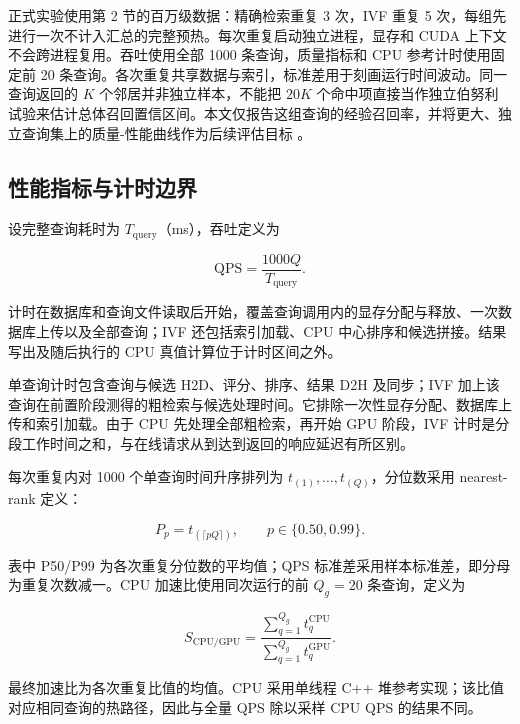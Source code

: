 \documentclass[UTF8,a4paper,zihao=5,fontset=none]{ctexart}
\begin{document}
正式实验使用第 2 节的百万级数据：精确检索重复 3 次，IVF 重复 5 次，每组先进行一次不计入汇总的完整预热。每次重复启动独立进程，显存和 CUDA 上下文不会跨进程复用。吞吐使用全部 1000 条查询，质量指标和 CPU 参考计时使用固定前 20 条查询。各次重复共享数据与索引，标准差用于刻画运行时间波动。同一查询返回的 $K$ 个邻居并非独立样本，不能把 $20K$ 个命中项直接当作独立伯努利试验来估计总体召回置信区间。本文仅报告这组查询的经验召回率，并将更大、独立查询集上的质量-性能曲线作为后续评估目标 \cite{r5}。


\subsection{性能指标与计时边界}

设完整查询耗时为 $T_{\mathrm{query}}$（ms），吞吐定义为


\nopagebreak[4]
\begin{equation}
\label{eq:5}
\mathrm{QPS}=\frac{1000Q}{T_{\mathrm{query}}}.
\end{equation}

计时在数据库和查询文件读取后开始，覆盖查询调用内的显存分配与释放、一次数据库上传以及全部查询；IVF 还包括索引加载、CPU 中心排序和候选拼接。结果写出及随后执行的 CPU 真值计算位于计时区间之外。


单查询计时包含查询与候选 H2D、评分、排序、结果 D2H 及同步；IVF 加上该查询在前置阶段测得的粗检索与候选处理时间。它排除一次性显存分配、数据库上传和索引加载。由于 CPU 先处理全部粗检索，再开始 GPU 阶段，IVF 计时是分段工作时间之和，与在线请求从到达到返回的响应延迟有所区别。


每次重复内对 1000 个单查询时间升序排列为 $t_{(1)},\ldots,t_{(Q)}$，分位数采用 nearest-rank 定义：


\nopagebreak[4]
\begin{equation}
\label{eq:6}
P_p=t_{(\lceil pQ\rceil)},\qquad p\in\{0.50,0.99\}.
\end{equation}

表中 P50/P99 为各次重复分位数的平均值；QPS 标准差采用样本标准差，即分母为重复次数减一。CPU 加速比使用同次运行的前 $Q_g=20$ 条查询，定义为


\nopagebreak[4]
\begin{equation}
\label{eq:7}
S_{\mathrm{CPU/GPU}}=
\frac{\sum_{q=1}^{Q_g}t_q^{\mathrm{CPU}}}
     {\sum_{q=1}^{Q_g}t_q^{\mathrm{GPU}}}.
\end{equation}

最终加速比为各次重复比值的均值。CPU 采用单线程 C++ 堆参考实现；该比值对应相同查询的热路径，因此与全量 QPS 除以采样 CPU QPS 的结果不同。
\end{document}
